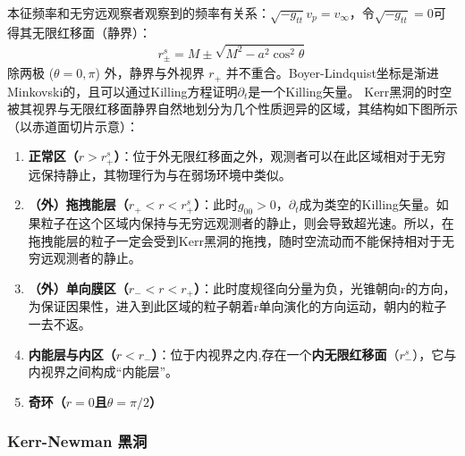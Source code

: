 本征频率和无穷远观察者观察到的频率有关系：$\sqrt{-g_{tt}} v_p = v_\infty$，令$\sqrt{-g_{tt}}= 0$可得其无限红移面（静界）：
\begin{align}
    r_{\pm}^s = M \pm \sqrt{M^2 - a^2\cos^2{\theta}} 
\end{align}
除两极 ($\theta=0,\pi$) 外，静界与外视界 $r_{+}$ 并不重合。Boyer-Lindquist坐标是渐进Minkovski的，且可以通过Killing方程证明$\partial_t$是一个Killing矢量。
Kerr黑洞的时空被其视界与无限红移面静界自然地划分为几个性质迥异的区域，其结构如下图所示（以赤道面切片示意）：
\begin{enumerate}
    \item \textbf{正常区（$r > r_+^s$）}：位于外无限红移面之外，观测者可以在此区域相对于无穷远保持静止，其物理行为与在弱场环境中类似。

    \item \textbf{（外）拖拽能层（$r_+ < r < r_+^s$）}：此时$g_{00}>0$，$\partial_t$成为类空的Killing矢量。如果粒子在这个区域内保持与无穷远观测者的静止，则会导致超光速。所以，在拖拽能层的粒子一定会受到Kerr黑洞的拖拽，随时空流动而不能保持相对于无穷远观测者的静止。

    \item \textbf{（外）单向膜区（$r_- < r < r_+$）}：此时度规径向分量为负，光锥朝向r的方向，为保证因果性，进入到此区域的粒子朝着r单向演化的方向运动，朝内的粒子一去不返。
    
    \item \textbf{内能层与内区（$r < r_-$）}：位于内视界之内,存在一个\textbf{内无限红移面}（$r_-^s$），它与内视界之间构成“内能层”。
    
    \item \textbf{奇环（$r = 0$且$\theta = \pi/2$）}
\end{enumerate}

\subsubsection{Kerr-Newman 黑洞}

